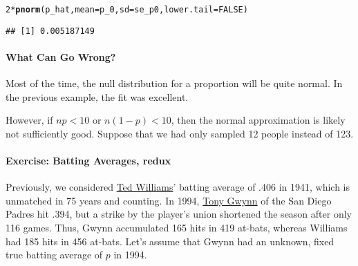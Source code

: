 \documentclass[10pt]{article}\usepackage[]{graphicx}\usepackage[]{color}
\makeatletter
\newcommand{\hlnum}[1]{\textcolor[rgb]{0.686,0.059,0.569}{#1}}%
\newcommand{\hlopt}[1]{\textcolor[rgb]{0,0,0}{#1}}%
\newcommand{\hlstd}[1]{\textcolor[rgb]{0.345,0.345,0.345}{#1}}%
\newcommand{\hlkwc}[1]{\textcolor[rgb]{0.333,0.667,0.333}{#1}}%
\newcommand{\hlkwd}[1]{\textcolor[rgb]{0.737,0.353,0.396}{\textbf{#1}}}%
\newenvironment{kframe}{%
 \def\at@end@of@kframe{}%
 \ifinner\ifhmode%
  \def\at@end@of@kframe{\end{minipage}}%
  \begin{minipage}{\columnwidth}%
 \fi\fi%
 \def\FrameCommand##1{\hskip\@totalleftmargin \hskip-\fboxsep
 \colorbox{shadecolor}{##1}\hskip-\fboxsep
     \hskip-\linewidth \hskip-\@totalleftmargin \hskip\columnwidth}%
 \MakeFramed {\advance\hsize-\width
   \@totalleftmargin\z@ \linewidth\hsize
   \@setminipage}}%
 {\par\unskip\endMakeFramed%
 \at@end@of@kframe}
\newenvironment{knitrout}{}{} %
\makeatother
\begin{document}
\begin{enumerate}
\begin{knitrout}
\color{fgcolor}\begin{kframe}
\begin{alltt}
\hlnum{2} \hlopt{*} \hlkwd{pnorm}\hlstd{(p_hat,} \hlkwc{mean} \hlstd{= p_0,} \hlkwc{sd} \hlstd{= se_p0,} \hlkwc{lower.tail} \hlstd{=} \hlnum{FALSE}\hlstd{)}
\end{alltt}
\begin{verbatim}
## [1] 0.005187149
\end{verbatim}
\end{kframe}
\end{knitrout}

\end{enumerate}


\paragraph{What Can Go Wrong?}

Most of the time, the null distribution for a proportion will be quite normal. In the previous example, the fit was excellent.



However, if $np < 10$ or $n(1-p) < 10$, then the normal approximation is likely not sufficiently good. Suppose that we had only sampled 12 people instead of 123. 



\paragraph{Exercise: Batting Averages, redux}

Previously, we considered \href{http://en.wikipedia.org/wiki/Ted_Williams}{Ted Williams}' batting average of .406 in 1941, which is unmatched in 75 years and counting. In 1994, \href{http://en.wikipedia.org/wiki/Tony_Gwynn}{Tony Gwynn} of the San Diego Padres hit .394, but a strike by the player's union shortened the season after only 116 games. Thus, Gwynn accumulated 165 hits in 419 at-bats, whereas Williams had 185 hits in 456 at-bats. Let's assume that Gwynn had an unknown, fixed true batting average of $p$ in 1994. 
\end{document}
